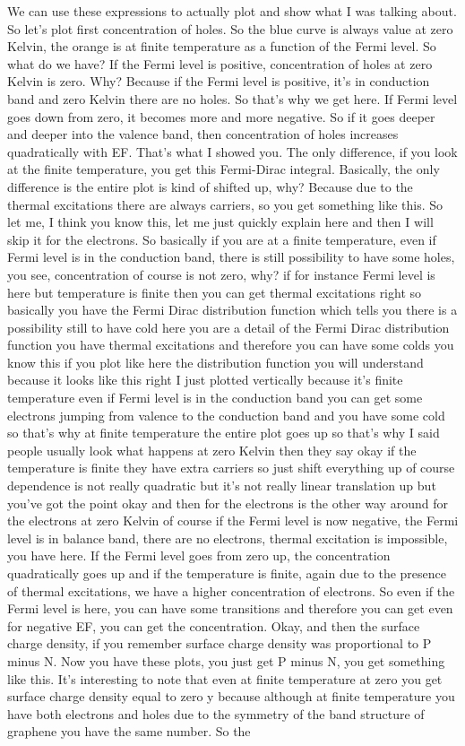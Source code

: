 We can use these expressions to actually plot and show what I was talking about. So let's plot first concentration of holes. So the blue curve is always value at zero Kelvin, the orange is at finite temperature as a function of the Fermi level. So what do we have? If the Fermi level is positive, concentration of holes at zero Kelvin is zero. Why? Because if the Fermi level is positive, it's in conduction band and zero Kelvin there are no holes. So that's why we get here. If Fermi level goes down from zero, it becomes more and more negative. So if it goes deeper and deeper into the valence band, then concentration of holes increases quadratically with EF. That's what I showed you. The only difference, if you look at the finite temperature, you get this Fermi-Dirac integral. Basically, the only difference is the entire plot is kind of shifted up, why? Because due to the thermal excitations there are always carriers, so you get something like this. So let me, I think you know this, let me just quickly explain here and then I will skip it for the electrons. So basically if you are at a finite temperature, even if Fermi level is in the conduction band, there is still possibility to have some holes, you see, concentration of course is not zero, why? if for instance Fermi level is here but temperature is finite then you can get thermal excitations right so basically you have the Fermi Dirac distribution function which tells you there is a possibility still to have cold here you are a detail of the Fermi Dirac distribution function you have thermal excitations and therefore you can have some colds you know this if you plot like here the distribution function you will understand because it looks like this right I just plotted vertically because it's finite temperature even if Fermi level is in the conduction band you can get some electrons jumping from valence to the conduction band and you have some cold so that's why at finite temperature the entire plot goes up so that's why I said people usually look what happens at zero Kelvin then they say okay if the temperature is finite they have extra carriers so just shift everything up of course dependence is not really quadratic but it's not really linear translation up but you've got the point okay and then for the electrons is the other way around for the electrons at zero Kelvin of course if the Fermi level is now negative, the Fermi level is in balance band, there are no electrons, thermal excitation is impossible, you have here. If the Fermi level goes from zero up, the concentration quadratically goes up and if the temperature is finite, again due to the presence of thermal excitations, we have a higher concentration of electrons. So even if the Fermi level is here, you can have some transitions and therefore you can get even for negative EF, you can get the concentration. Okay, and then the surface charge density, if you remember surface charge density was proportional to P minus N. Now you have these plots, you just get P minus N, you get something like this. It's interesting to note that even at finite temperature at zero you get surface charge density equal to zero y because although at finite temperature you have both electrons and holes due to the symmetry of the band structure of graphene you have the same number. So the 